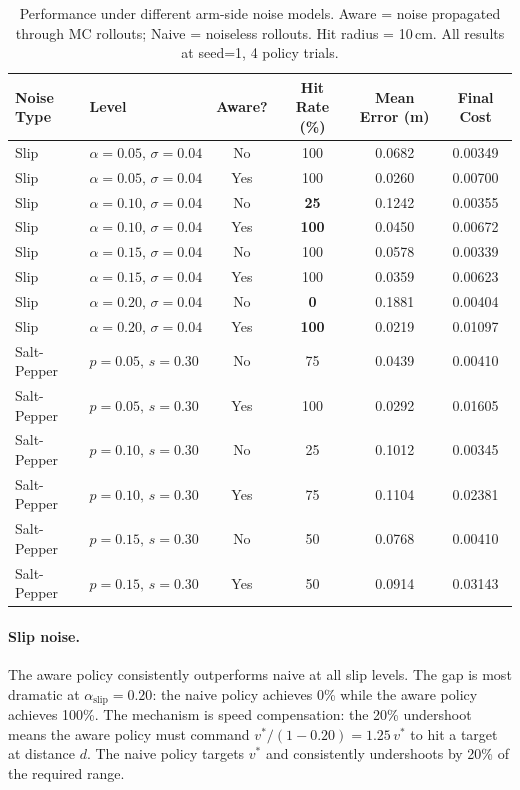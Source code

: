 \begin{table}[t]
  \centering
  \caption{Performance under different arm-side noise models.
           Aware = noise propagated through MC rollouts; Naive = noiseless rollouts.
           Hit radius = 10\,cm. All results at seed=1, 4 policy trials.}
  \label{tab:noise_results}
  \small
  \begin{tabular}{llcccc}
    \toprule
    Noise Type & Level & Aware? & Hit Rate (\%) & Mean Error (m) & Final Cost \\
    \midrule
    Slip & $\alpha{=}0.05,\,\sigma{=}0.04$ & No  & 100 & 0.0682 & 0.00349 \\
    Slip & $\alpha{=}0.05,\,\sigma{=}0.04$ & Yes & 100 & 0.0260 & 0.00700 \\
    Slip & $\alpha{=}0.10,\,\sigma{=}0.04$ & No  & \textbf{25}  & 0.1242 & 0.00355 \\
    Slip & $\alpha{=}0.10,\,\sigma{=}0.04$ & Yes & \textbf{100} & 0.0450 & 0.00672 \\
    Slip & $\alpha{=}0.15,\,\sigma{=}0.04$ & No  & 100 & 0.0578 & 0.00339 \\
    Slip & $\alpha{=}0.15,\,\sigma{=}0.04$ & Yes & 100 & 0.0359 & 0.00623 \\
    Slip & $\alpha{=}0.20,\,\sigma{=}0.04$ & No  & \textbf{0}   & 0.1881 & 0.00404 \\
    Slip & $\alpha{=}0.20,\,\sigma{=}0.04$ & Yes & \textbf{100} & 0.0219 & 0.01097 \\
    \midrule
    Salt-Pepper & $p{=}0.05,\,s{=}0.30$ & No  & 75  & 0.0439 & 0.00410 \\
    Salt-Pepper & $p{=}0.05,\,s{=}0.30$ & Yes & 100 & 0.0292 & 0.01605 \\
    Salt-Pepper & $p{=}0.10,\,s{=}0.30$ & No  & 25  & 0.1012 & 0.00345 \\
    Salt-Pepper & $p{=}0.10,\,s{=}0.30$ & Yes & 75  & 0.1104 & 0.02381 \\
    Salt-Pepper & $p{=}0.15,\,s{=}0.30$ & No  & 50  & 0.0768 & 0.00410 \\
    Salt-Pepper & $p{=}0.15,\,s{=}0.30$ & Yes & 50  & 0.0914 & 0.03143 \\
    \bottomrule
  \end{tabular}
\end{table}

\paragraph{Slip noise.}
The aware policy consistently outperforms naive at all slip levels.
The gap is most dramatic at $\alpha_{\mathrm{slip}} = 0.20$: the naive policy achieves
0\% while the aware policy achieves 100\%.
The mechanism is speed compensation: the 20\% undershoot means the aware policy must
command $v^* / (1 - 0.20) = 1.25\,v^*$ to hit a target at distance $d$.
The naive policy targets $v^*$ and consistently undershoots by 20\% of the required
range.

